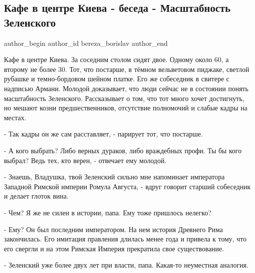  
 
 
 
 
 
\subsection{Кафе в центре Киева - беседа - Масштабность Зеленского}
\label{sec:21_09_2021.fb.bereza_borislav.1.kafe_kiev_beseda_zelenskii}
 
\ifcmt
 author_begin
   author_id bereza_borislav
 author_end
\fi

Кафе в центре Киева. За соседним столом сидят двое. Одному около 60, а второму
не более 30. Тот, что постарше, в тёмном вельветовом пиджаке, светлой рубашке и
темно-бордовом шейном платке. Его же собеседник в свитере с надписью Армани.
Молодой доказывает, что люди сейчас не в состоянии понять масштабность
Зеленского. Рассказывает о том, что тот много хочет достигнуть, но мешают козни
предшественников, отсутствие полномочий и слабые кадры на местах.

- Так кадры он же сам расставляет, - парирует тот, что постарше. 

- А кого выбрать? Либо верных дураков, либо враждебных профи. Ты бы кого
выбрал? Ведь тех, кто верен, - отвечает ему молодой. 

- Знаешь, Владушка, твой Зеленский сильно мне напоминает императора Западной
Римской империи Ромула Августа, - вдруг говорит старший собеседник и делает
глоток вина.

- Чем? Я же не силен в истории, папа. Ему тоже пришлось нелегко?

- Ему? Он был последним императором. На нем история Древнего Рима закончилась.
Его имитация правления длилась менее года и привела к тому, что его свергли и
на этом Римская Империя прекратила свое существование. 

- Зеленский уже более двух лет при власти, папа. Какая-то неуместная аналогия. 

